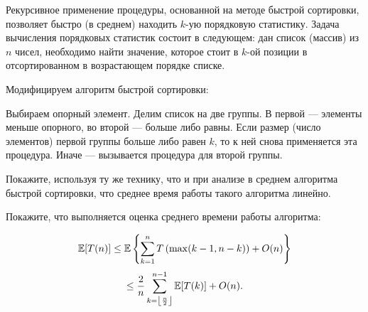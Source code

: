 \begin{problem}

Рекурсивное применение процедуры, основанной на методе быстрой сортировки, позволяет быстро (в среднем) находить $k$-ую порядковую статистику. Задача вычисления порядковых статистик состоит в следующем: дан список (массив) из $n$ чисел, необходимо найти значение, которое стоит в $k$-ой позиции в отсортированном в возрастающем порядке списке. 

Модифицируем алгоритм быстрой сортировки:


 Выбираем опорный элемент. Делим список на две группы. В первой --- элементы меньше опорного, во второй --- больше либо равны.
 Если размер (число элементов) первой группы больше либо равен $k$, то к ней снова применяется эта процедура. Иначе --- вызывается процедура для второй группы.
 
Покажите, используя ту же технику, что и при анализе в среднем алгоритма быстрой сортировки, что среднее время работы такого алгоритма линейно.

\begin{ordre}

\noindent Покажите, что выполняется оценка среднего времени работы алгоритма:

\[
\mathrm{{\mathbb E}} [T(n)]\le \mathrm{{\mathbb E}}\left\{\sum _{k=1}^{n}T\left(\max (k-1,n-k)\right)+O(n)\right\} 
\]
\[ \le \frac{2}{n} \sum _{k=\left\lfloor \frac{n}{2} \right\rfloor }^{n-1} \mathrm{{\mathbb E}}[T(k)] + O(n).
\]



\end{ordre}
\end{problem}



